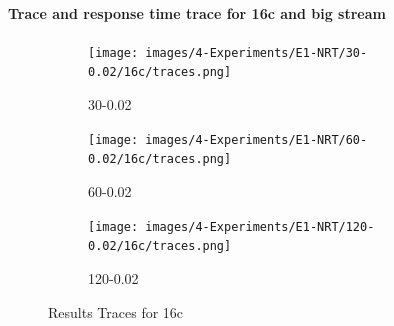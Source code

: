 \documentclass[12pt,a4paper]{article}
\begin{document}
\paragraph{Trace and response time trace for 16c and big stream\\}

\begin{figure}[H]
    \centering
    \begin{subfigure}[b]{\textwidth}
        \centering
        \texttt{[image: images/4-Experiments/E1-NRT/30-0.02/16c/traces.png]}
        \caption{30-0.02}
    \end{subfigure}
    
    \vspace{0.5cm} %
    \begin{subfigure}[b]{\textwidth}
        \centering
        \texttt{[image: images/4-Experiments/E1-NRT/60-0.02/16c/traces.png]}
        \caption{60-0.02}
    \end{subfigure}
    
    \vspace{0.5cm} %
    \begin{subfigure}[b]{\textwidth}
        \centering
        \texttt{[image: images/4-Experiments/E1-NRT/120-0.02/16c/traces.png]}
        \caption{120-0.02}
    \end{subfigure}

    \caption{Results Traces for 16c}
    \label{img:exps-small-traces-16c}
\end{figure}
\end{document}
